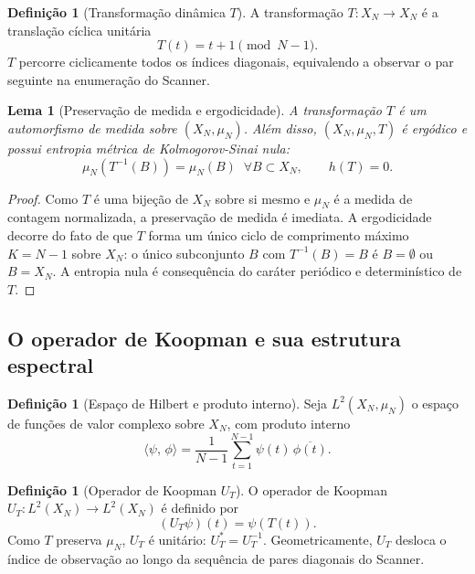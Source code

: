 \documentclass[12pt,a4paper]{article}
\newtheorem{lemma}[theorem]{Lema}
\theoremstyle{definition}
\newtheorem{definition}[theorem]{Definição}
\newcommand{\ip}[2]{\langle #1,\, #2 \rangle}
\begin{document}
	\begin{definition}[Transformação dinâmica $T$]
		A transformação $T: X_N \to X_N$ é a translação cíclica unitária
		\[
		T(t) = t + 1 \pmod{N-1}.
		\]
		$T$ percorre ciclicamente todos os índices diagonais,
		equivalendo a observar o par seguinte na enumeração do Scanner.
	\end{definition}
	
	\begin{lemma}[Preservação de medida e ergodicidade]
		\label{lem:ergodico}
		A transformação $T$ é um automorfismo de medida sobre
		$(X_N, \mu_N)$. Além disso, $(X_N, \mu_N, T)$ é ergódico e
		possui entropia métrica de Kolmogorov-Sinai nula:
		\[
		\mu_N(T^{-1}(B)) = \mu_N(B)\;\;\forall B \subset X_N,
		\qquad h(T) = 0.
		\]
	\end{lemma}
	
	\begin{proof}
		Como $T$ é uma bijeção de $X_N$ sobre si mesmo e $\mu_N$ é a
		medida de contagem normalizada, a preservação de medida é
		imediata. A ergodicidade decorre do fato de que $T$ forma um
		único ciclo de comprimento máximo $K = N-1$ sobre $X_N$: o
		único subconjunto $B$ com $T^{-1}(B) = B$ é $B = \emptyset$ ou
		$B = X_N$. A entropia nula é consequência do caráter periódico
		e determinístico de $T$.
	\end{proof}
	
	\subsection{O operador de Koopman e sua estrutura espectral}
	
	\begin{definition}[Espaço de Hilbert e produto interno]
		Seja $L^2(X_N, \mu_N)$ o espaço de funções de valor complexo
		sobre $X_N$, com produto interno
		\[
		\ip{\psi}{\phi} = \frac{1}{N-1}\sum_{t=1}^{N-1}
		\psi(t)\,\overline{\phi(t)}.
		\]
	\end{definition}
	
	\begin{definition}[Operador de Koopman $U_T$]
		\label{def:koopman}
		O operador de Koopman $U_T: L^2(X_N) \to L^2(X_N)$ é definido
		por
		\[
		(U_T\psi)(t) = \psi(T(t)).
		\]
		Como $T$ preserva $\mu_N$, $U_T$ é unitário: $U_T^* = U_T^{-1}$.
		Geometricamente, $U_T$ desloca o índice de observação ao longo
		da sequência de pares diagonais do Scanner.
	\end{definition}
	
\end{document}

